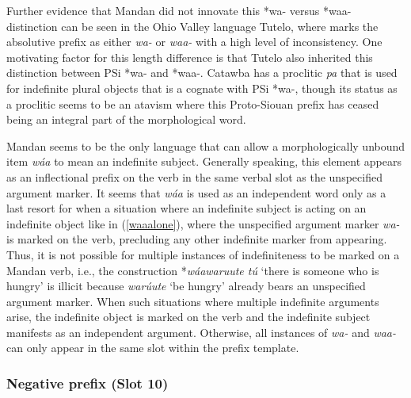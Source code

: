 Further evidence that Mandan did not innovate this *wa- versus *waa- distinction can be seen in the Ohio Valley language Tutelo, where \citet{oliverio1997} marks the absolutive prefix as either \textit{wa-} or \textit{waa-} with a high level of inconsistency. One motivating factor for this length difference is that Tutelo also inherited this distinction between PSi *wa- and *waa-. Catawba has a proclitic \textit{pa} that is used for indefinite plural objects that is a cognate with PSi *wa-, though its status as a proclitic seems to be an atavism where this Proto-Siouan prefix has ceased being an integral part of the morphological word. 

Mandan seems to be the only language that can allow a morphologically unbound item \textit{wáa} to mean an indefinite subject. Generally speaking, this element appears as an inflectional prefix on the verb in the same verbal slot as the unspecified argument marker. It seems that \textit{wáa} is used as an independent word only as a last resort for when a situation where an indefinite subject is acting on an indefinite object like in (\ref{waaalone}), where the unspecified argument marker \textit{wa-} is marked on the verb, precluding any other indefinite marker from appearing. Thus, it is not possible for multiple instances of indefiniteness to be marked on a Mandan verb, i.e., the construction *\textit{wáawaruute tú} `there is someone who is hungry' is illicit because \textit{warúute} `be hungry' already bears an unspecified argument marker. When such situations where multiple indefinite arguments arise, the indefinite object is marked on the verb and the indefinite subject manifests as an independent argument. Otherwise, all instances of \textit{wa-} and \textit{waa-} can only appear in the same slot within the prefix template.

\subsubsection{Negative prefix (Slot 10)}\label{SubsubsecNegative}

